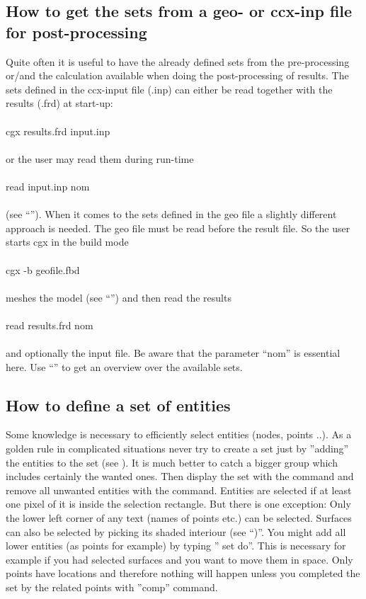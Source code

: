 \documentclass{article}
\begin{document}
\begin{appendix}
\subsection{\label{How to get the sets from a geo- or ccx-inp file for post-processing}How to get the sets from a geo- or ccx-inp file for post-processing}
Quite often it is useful to have the already defined sets from the pre-processing or/and the calculation available when doing the post-processing of results. The sets defined in the ccx-input file (.inp) can either be read together with the results (.frd) at start-up:\\\\cgx results.frd input.inp\\\\or the user may read them during run-time\\\\read input.inp nom\\\\ (see ``''). When it comes to the sets defined in the geo file a slightly different approach is needed. The geo file must be read before the result file. So the user starts cgx in the build mode\\\\cgx -b geofile.fbd\\\\meshes the model (see ``'') and then read the results\\\\read results.frd nom\\\\and optionally the input file. Be aware that the parameter ``nom'' is essential here. Use ``'' to get an overview over the available sets.

\subsection{\label{How to define a set of entities}How to define a set of entities}
Some knowledge is necessary to efficiently select entities (nodes, points ..). As a golden rule in complicated situations never try to create a set just by ''adding'' the entities to the set (see ). It is much better to catch a bigger group which includes certainly the wanted ones. Then display the set with the  command and remove all unwanted entities with the  command. Entities are selected if at least one pixel of it is inside the selection rectangle. But there is one exception: Only the lower left corner of any text (names of points etc.) can be selected. Surfaces can also be selected by picking its shaded interiour (see ``)''. You might add all lower entities (as points for example) by typing '' set do''. This is necessary for example if you had selected surfaces and you want to move them in space. Only points have locations and therefore nothing will happen unless you completed the set by the related points with ''comp'' command.


\end{appendix}
\end{document}

